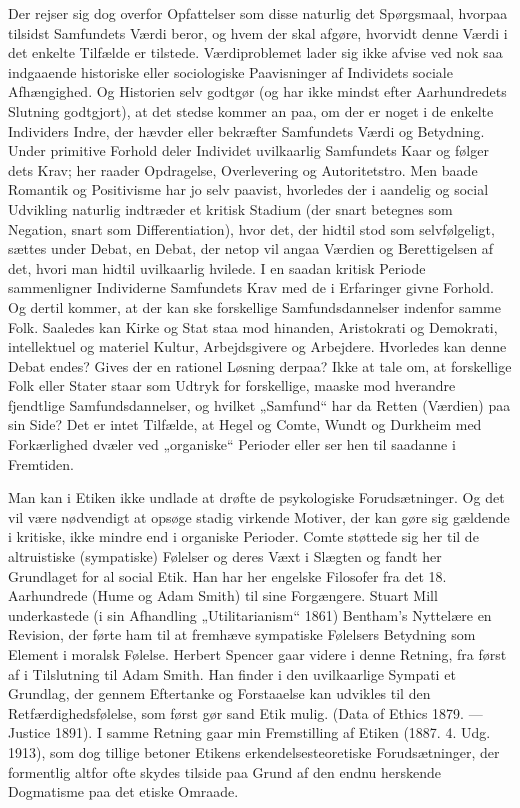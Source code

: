 \documentclass[12pt,a4paper,openany]{book}
\newcommand{\opage}[1]{\marginnote{\footnotesize\textit{[#1]}}}
\begin{document}
Der rejser sig dog overfor Opfattelser som disse naturlig det
Spørgsmaal, hvorpaa tilsidst Samfundets Værdi beror, og hvem der
skal afgøre, hvorvidt denne Værdi i det enkelte Tilfælde er tilstede.
Værdiproblemet lader sig ikke afvise ved nok saa indgaaende historiske
eller sociologiske Paavisninger af Individets sociale Afhængighed.
Og Historien selv godtgør (og har ikke mindst efter Aarhundredets
Slutning godtgjort), at det stedse kommer an paa, om der
er noget i de enkelte Individers Indre, der hævder eller bekræfter
Samfundets Værdi og Betydning. Under primitive Forhold deler Individet
uvilkaarlig Samfundets Kaar og følger dets Krav; her raader
Opdragelse, Overlevering og Autoritetstro. Men baade Romantik og
Positivisme har jo selv paavist, hvorledes der i aandelig og social
Udvikling naturlig indtræder et kritisk Stadium (der snart betegnes
som Negation, snart som Differentiation), hvor det, der hidtil stod
som selvfølgeligt, sættes under Debat, en Debat, der netop vil angaa
Værdien og Berettigelsen af det, hvori man hidtil uvilkaarlig hvilede.
I en saadan kritisk Periode sammenligner Individerne Samfundets
Krav med de i Erfaringer givne Forhold. Og dertil kommer, at der
kan ske forskellige Samfundsdannelser indenfor samme Folk. Saaledes
kan Kirke og Stat staa mod hinanden, Aristokrati og Demokrati,
intellektuel og materiel Kultur, Arbejdsgivere og Arbejdere. Hvorledes
kan denne Debat endes? Gives der en rationel Løsning derpaa?
Ikke at tale om, at forskellige Folk eller Stater staar som Udtryk
for forskellige, maaske mod hverandre fjendtlige Samfundsdannelser,
og hvilket „Samfund“ har da Retten (Værdien) paa sin
Side? Det er intet Tilfælde, at Hegel og Comte, Wundt og Durkheim
med Forkærlighed dvæler ved „organiske“ Perioder eller ser hen
til saadanne i Fremtiden.

\opage{71}Man kan i Etiken ikke undlade at drøfte de psykologiske Forudsætninger.
Og det vil være nødvendigt at opsøge stadig virkende
Motiver, der kan gøre sig gældende i kritiske, ikke mindre end i organiske
Perioder. Comte støttede sig her til de altruistiske (sympatiske)
Følelser og deres Væxt i Slægten og fandt her Grundlaget for al
social Etik. Han har her engelske Filosofer fra det 18. Aarhundrede
(Hume og Adam Smith) til sine Forgængere. Stuart Mill underkastede
(i sin Afhandling „Utilitarianism“ 1861) Bentham’s Nyttelære en
Revision, der førte ham til at fremhæve sympatiske Følelsers Betydning
som Element i moralsk Følelse. Herbert Spencer gaar videre
i denne Retning, fra først af i Tilslutning til Adam Smith. Han finder
i den uvilkaarlige Sympati et Grundlag, der gennem Eftertanke
og Forstaaelse kan udvikles til den Retfærdighedsfølelse, som først
gør sand Etik mulig. (Data of Ethics 1879. --- Justice 1891). I samme
Retning gaar min Fremstilling af Etiken (1887. 4. Udg. 1913), som
dog tillige betoner Etikens erkendelsesteoretiske Forudsætninger, der
formentlig altfor ofte skydes tilside paa Grund af den endnu herskende
Dogmatisme paa det etiske Omraade.
\end{document}
